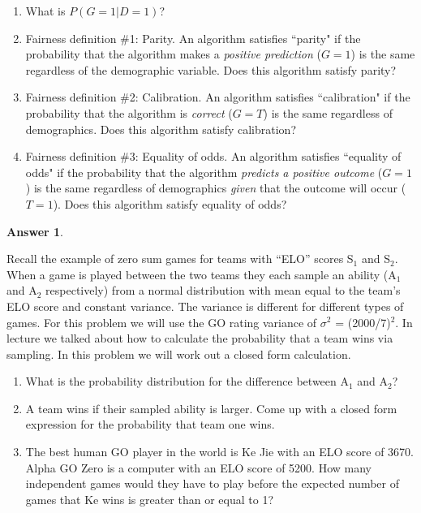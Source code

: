 \documentclass[12pt]{article}
\renewcommand{\(}{\left(}
\renewcommand{\)}{\right)}
\theoremstyle{definition}
\newtheorem*{answer}{Answer}
\begin{document}
\begin{enumerate}
{\begin{enumerate}[label=\alph*.]
    
    \item What is $P(G =1 | D = 1)$?
    
    
    \item Fairness definition \#1: Parity. 
    An algorithm satisfies ``parity" if the probability that the algorithm makes a \emph{positive prediction} ($G=1$) is the same regardless of the demographic variable. Does this algorithm satisfy parity? 




    \item Fairness definition \#2: Calibration. 
    An algorithm satisfies ``calibration" if the probability that the algorithm is \emph{correct} ($G = T$) is the same regardless of demographics. Does this algorithm satisfy calibration? 
    
    
    \item Fairness definition \#3: Equality of odds. 
    An algorithm satisfies ``equality of odds" if the probability that the algorithm \emph{predicts a positive outcome} ($G=1$) is the same regardless of demographics \emph{given} that the outcome will occur ($T=1$). Does this algorithm satisfy equality of odds?


    \end{enumerate}
    \begin{shaded}
    \begin{answer}
    
    \end{answer}
    \end{shaded}
    \newpage
    \item Recall the example of zero sum games for teams with ``ELO'' scores S$_1$ and S$_2$. When a game is played between the two teams they each sample an ability (A$_1$ and A$_2$ respectively) from a normal distribution with mean equal to the team's ELO score and constant variance. The variance is different for different types of games. For this problem we will use the GO rating variance of $\sigma^2$ = (2000/7)$^2$. In lecture we talked about how to calculate the probability that a team wins via sampling. In this problem we will work out a closed form calculation.
    \begin{enumerate}
        \item What is the probability distribution for the difference between A$_1$ and A$_2$?
        \item A team wins if their sampled ability is larger. Come up with a closed form expression for the probability that team one wins.
        \item The best human GO player in the world is Ke Jie with an ELO score of 3670. Alpha GO Zero is a computer with an ELO score of 5200. How many independent games would they have to play before the expected number of games that Ke wins is greater than or equal to 1?
    \end{enumerate}
    
}
\end{enumerate}
\end{document}
